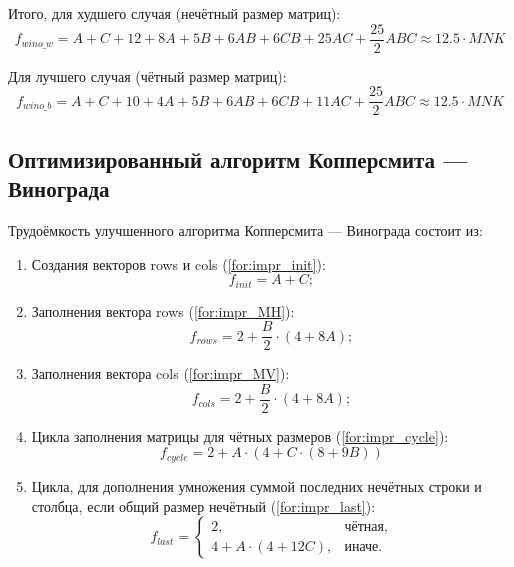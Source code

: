 Итого, для худшего случая (нечётный размер матриц):
\begin{equation}
    \label{for:bad}
    f_{wino\_w} = A + C + 12 + 8A + 5B + 6AB + 6CB + 25AC + \frac{25}{2}ABC \approx 12.5 \cdot MNK
\end{equation}

Для лучшего случая (чётный размер матриц):
\begin{equation}
    \label{for:good}
    f_{wino\_b} = A + C + 10 + 4A + 5B + 6AB + 6CB + 11AC + \frac{25}{2}ABC \approx 12.5 \cdot MNK
\end{equation}

\subsection{Оптимизированный алгоритм Копперсмита — Винограда}

Трудоёмкость улучшенного алгоритма Копперсмита — Винограда состоит из:
\begin{enumerate}
    \item Создания векторов rows и cols (\ref{for:impr_init}):
    \begin{equation}
        \label{for:impr_init}
        f_{init} = A + C;
    \end{equation}

    \item Заполнения вектора rows (\ref{for:impr_MH}):
    \begin{equation}
        \label{for:impr_MH}
        f_{rows} = 2 + \frac{B}{2} \cdot (4 + 8A);
    \end{equation}

    \item Заполнения вектора cols (\ref{for:impr_MV}):
    \begin{equation}
        \label{for:impr_MV}
        f_{cols} = 2 + \frac{B}{2} \cdot (4 + 8A);
    \end{equation}

    \item Цикла заполнения матрицы для чётных размеров (\ref{for:impr_cycle}):
    \begin{equation}
        \label{for:impr_cycle}
        f_{cycle} = 2 + A \cdot (4 + C \cdot (8 + 9B))
    \end{equation}

    \item Цикла, для дополнения умножения суммой последних нечётных строки и столбца, если общий размер нечётный (\ref{for:impr_last}):
    \begin{equation}
        \label{for:impr_last}
        f_{last} =
        \begin{cases}
            2, & \text{чётная,}\\
            4 + A \cdot (4 + 12C), & \text{иначе.}
        \end{cases}
    \end{equation}
\end{enumerate}

